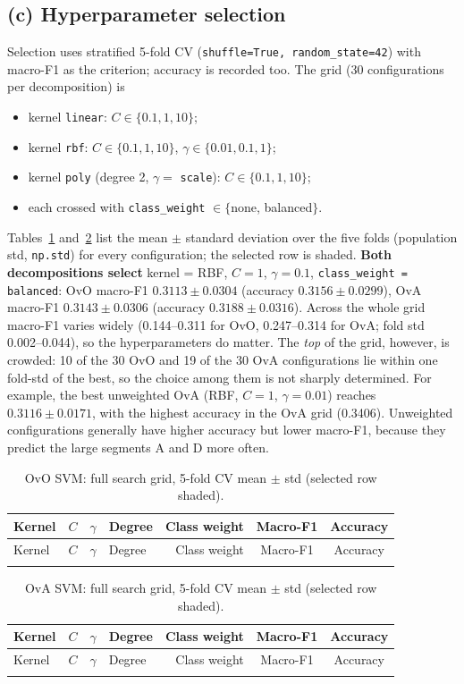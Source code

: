 \documentclass[11pt]{article}
\begin{document}
\subsection{(c) Hyperparameter selection}
Selection uses stratified 5-fold CV (\texttt{shuffle=True, random\_state=42}) with macro-F1 as the
criterion; accuracy is recorded too. The grid (30 configurations per decomposition) is
\begin{itemize}
\item kernel \texttt{linear}: $C\in\{0.1,1,10\}$;
\item kernel \texttt{rbf}: $C\in\{0.1,1,10\}$, $\gamma\in\{0.01,0.1,1\}$;
\item kernel \texttt{poly} (degree 2, $\gamma=$ \texttt{scale}): $C\in\{0.1,1,10\}$;
\item each crossed with \texttt{class\_weight} $\in\{$none, balanced$\}$.
\end{itemize}
Tables~\ref{tab:gridovo} and~\ref{tab:gridova} list the mean $\pm$ standard deviation over the five
folds (population std, \texttt{np.std}) for every configuration; the selected row is shaded.
\textbf{Both decompositions select} kernel = RBF, $C=1$, $\gamma=0.1$, \texttt{class\_weight =
balanced}: OvO macro-F1 $0.3113\pm0.0304$ (accuracy $0.3156\pm0.0299$), OvA macro-F1
$0.3143\pm0.0306$ (accuracy $0.3188\pm0.0316$).
Across the whole grid macro-F1 varies widely (0.144--0.311 for OvO, 0.247--0.314 for OvA; fold std
0.002--0.044), so the hyperparameters do matter. The \emph{top} of the grid, however, is crowded:
10 of the 30 OvO and 19 of the 30 OvA configurations lie within one fold-std of the best, so the
choice among them is not sharply determined. For example, the best unweighted OvA (RBF, $C=1$,
$\gamma=0.01$) reaches $0.3116\pm0.0171$, with the highest accuracy in the OvA grid (0.3406).
Unweighted configurations generally have higher accuracy but lower macro-F1, because they predict the
large segments A and D more often.

{\small
\setlength{\tabcolsep}{5pt}
\begin{longtable}{@{}lrllrcc@{}}
\caption{OvO SVM: full search grid, 5-fold CV mean $\pm$ std (selected row shaded).}\label{tab:gridovo}\\
\toprule
Kernel & $C$ & $\gamma$ & Degree & Class weight & Macro-F1 & Accuracy \\
\midrule\endfirsthead
\toprule
Kernel & $C$ & $\gamma$ & Degree & Class weight & Macro-F1 & Accuracy \\
\midrule\endhead
\bottomrule\endfoot

\end{longtable}

\begin{longtable}{@{}lrllrcc@{}}
\caption{OvA SVM: full search grid, 5-fold CV mean $\pm$ std (selected row shaded).}\label{tab:gridova}\\
\toprule
Kernel & $C$ & $\gamma$ & Degree & Class weight & Macro-F1 & Accuracy \\
\midrule\endfirsthead
\toprule
Kernel & $C$ & $\gamma$ & Degree & Class weight & Macro-F1 & Accuracy \\
\midrule\endhead
\bottomrule\endfoot

\end{longtable}
}
\end{document}
